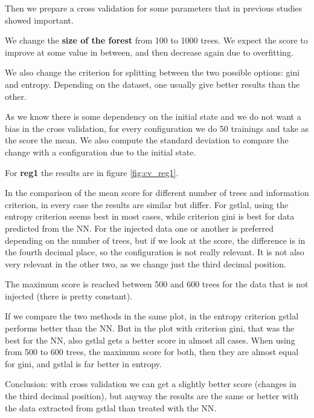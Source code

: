\documentclass[prd,aps,twocolumn,a4paper,showkeys,nofootinbib]{revtex4-2}
\begin{document}
Then we prepare a cross validation for some parameters that in previous studies showed important. 

We change the\textbf{ size of the forest} from 100 to 1000 trees. We expect the score to improve at some value in between, and then decrease again due to overfitting.


We also change the criterion for splitting between the two possible options: gini and entropy. Depending on the dataset, one usually give better results than the other.

As we know there is some dependency on the initial state and we do not want a bias in the cross validation, for every configuration we do 50 trainings and take as the score the mean. We also compute the standard deviation to compare the change with a configuration due to the initial state.

For \textbf{reg1} the results are in figure \ref{fig:cv_reg1}.

In the comparison of the mean score for different number of trees and information criterion, in every case the results are similar but differ. For gstlal, using the entropy criterion seems best in most cases, while criterion gini is best for data predicted from the NN. For the injected data one or another is preferred depending on the number of trees, but if we look at the score, the difference is in the fourth decimal place, so the configuration is not really relevant. It is not also very relevant in the other two, as we change just the third decimal position.

The maximum score is reached between 500 and 600 trees for the data that is not injected (there is pretty constant).

If we compare the two methods in the same plot, in the entropy criterion gstlal performs better than the NN. But in the plot with criterion gini, that was the best for the NN, also gstlal gets a better score in almost all cases. When using from 500 to 600 trees, the maximum score for both, then they are almost equal for gini, and gstlal is far better in entropy.

Conclusion: with cross validation we can get a slightly better score (changes in the third decimal position), but anyway the results are the same or better with the data extracted from gstlal than treated with the NN.
\end{document}

